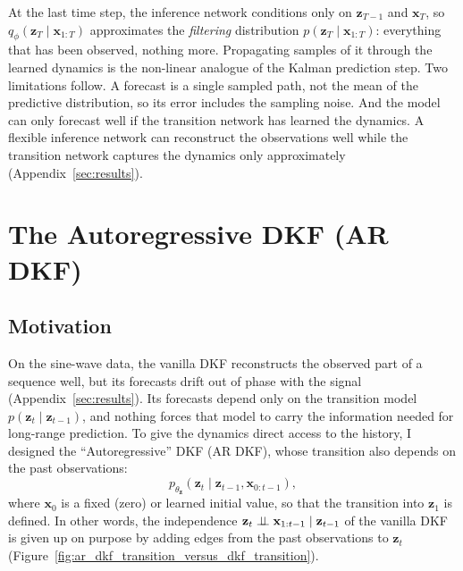 \begin{inwords}
At the last time step, the inference network conditions only on
$\mathbf{z}_{T-1}$ and $\mathbf{x}_{T}$, so
$q_\phi(\mathbf{z}_T \mid \mathbf{x}_{1:T})$ approximates the
\emph{filtering} distribution $p(\mathbf{z}_T \mid \mathbf{x}_{1:T})$:
everything that has been observed, nothing more. Propagating samples of
it through the learned dynamics is the non-linear analogue of the Kalman
prediction step. Two limitations follow. A forecast is a single sampled
path, not the mean of the predictive distribution, so its error includes
the sampling noise. And the model can only forecast well if the
transition network has learned the dynamics. A flexible inference
network can reconstruct the observations well while the transition
network captures the dynamics only approximately
(Appendix~\ref{sec:results}).
\end{inwords}

\section{The Autoregressive DKF (AR DKF)}\label{sec:ar_dkf}

\subsection{Motivation}

On the sine-wave data, the vanilla DKF reconstructs the observed part of
a sequence well, but its forecasts drift out of phase with the signal
(Appendix~\ref{sec:results}).
Its forecasts depend only on the transition model
$p(\mathbf{z}_t \mid \mathbf{z}_{t-1})$, and nothing forces that model to
carry the information needed for long-range prediction. To give the
dynamics direct access to the history, I designed the
\enquote{Autoregressive} DKF (AR DKF), whose transition also depends on
the past observations:
\begin{equation*}
    p_{\theta_{\mathbf{z}}}(\mathbf{z}_t \mid \mathbf{z}_{t-1},
    \mathbf{x}_{0:t-1}),
\end{equation*}
where $\mathbf{x}_0$ is a fixed (zero) or learned initial value, so that
the transition into $\mathbf{z}_1$ is defined. In other words, the
independence $\mathbf{z}_t \perp\!\!\!\perp \mathbf{x}_{1:t-1} \mid
\mathbf{z}_{t-1}$ of the vanilla DKF is given up on purpose by adding
edges from the past observations to $\mathbf{z}_t$
(Figure~\ref{fig:ar_dkf_transition_versus_dkf_transition}).

